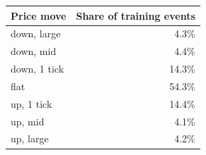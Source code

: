 \begin{tabular}{lr}
\toprule
Price move & Share of training events \\
\midrule
down, large & 4.3\% \\
down, mid & 4.4\% \\
down, 1 tick & 14.3\% \\
flat & 54.3\% \\
up, 1 tick & 14.4\% \\
up, mid & 4.1\% \\
up, large & 4.2\% \\
\bottomrule
\end{tabular}
